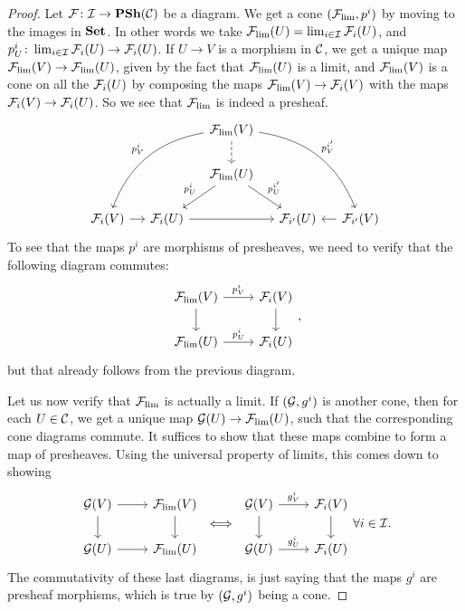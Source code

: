 \documentclass{article}
\begin{document}
\begin{proof}
    Let $\mathcal{F} \colon \mathcal{I} \to \operatorname{\mathbf{PSh}}(\mathcal{C})$ be a diagram.
    We get a cone $(\mathcal{F}_{\lim}, p^i)$ by
    moving to the images in $\operatorname{\mathbf{Set}}$. In other words we take
    $\mathcal{F}_{\lim} (U) = \lim_{i \in \mathcal{I}} \mathcal{F}_i(U)$,
    and $p^i_U \colon \lim_{i\in \mathcal{I}}\mathcal{F}_i(U) \to \mathcal{F}_i(U)$.
    If $U\to V$ is a morphism in $\mathcal{C}$, we get a unique map
    $\mathcal{F}_{\lim}(V) \to \mathcal{F}_{\lim}(U)$, given by the fact
    that $\mathcal{F}_{\lim}(U)$ is a limit, and $\mathcal{F}_{\lim}(V)$ is a cone
    on all the $\mathcal{F}_i(U)$ by composing the maps $\mathcal{F}_{\lim}(V) \to \mathcal{F}_i(V)$ with
    the maps $\mathcal{F}_i(V) \to \mathcal{F}_i(U)$. So we see that $\mathcal{F}_{\lim}$
    is indeed a presheaf.
    \begin{equation*}
        \begin{tikzcd}[column sep=small]
            &&\mcF_{\lim}(V) \dar[dashed] \ar[ddll, bend right, "p^i_V"'] \ar[ddrr, bend left, "p^{i'}_V"]\\
            &&\mcF_{\lim}(U) \ar[dl, "p^i_U"'] \ar[dr, "p^{i'}_U"]\\
            \mcF_i(V) \rar &\mcF_i(U) \ar[rr] &&\mcF_{i'}(U) &\mcF_{i'}(V) \lar
        \end{tikzcd}
    \end{equation*}
    To see that the maps $p^i$ are morphisms of presheaves, we need
    to verify that the following diagram commutes:
    \begin{equation*}
        \begin{tikzcd}
            \mcF_{\lim}(V) \dar \rar["p^i_V"] & \mcF_i(V) \dar \\
            \mcF_{\lim}(U) \rar["p^i_U"] & \mcF_i(U)
        \end{tikzcd},
    \end{equation*}
    but that already follows from the previous diagram.

    Let us now verify that $\mathcal{F}_{\lim}$ is actually a limit.
    If $(\mathcal{G}, g^i)$ is another cone, then for each $U\in \mathcal{C}$,
    we get a unique map $\mathcal{G}(U) \to \mathcal{F}_{\lim}(U)$, such that the
    corresponding cone diagrams commute. It suffices to show that these
    maps combine to form a map of presheaves.
    Using the universal property of limits, this comes down to showing
    \begin{equation*}
        \begin{tikzcd}
            \mcG(V)\rar \dar & \mcF_{\lim}(V) \dar \\
            \mcG(U)\rar & \mcF_{\lim}(U)
        \end{tikzcd}
        \iff
        \begin{tikzcd}
            \mcG(V)\rar["g^i_V"] \dar & \mcF_{i}(V) \dar \\
            \mcG(U)\rar["g^i_U"] & \mcF_{i}(U)
        \end{tikzcd}
        \forall i\in \mcI.
    \end{equation*}
    The commutativity of these last diagrams, is just saying that the
    maps $g^i$ are presheaf morphisms, which is true by $(\mathcal{G}, g^i)$ being a cone.
\end{proof}
\end{document}
